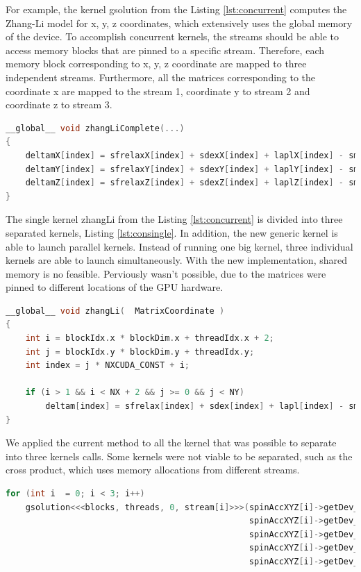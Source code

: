 For example, the kernel {\listf gsolution} from the Listing \ref{lst:concurrent} computes the Zhang-Li model for x, y, z coordinates, which extensively uses the global memory of the device. To accomplish concurrent kernels, the streams should be able to access memory blocks that are pinned to a specific stream. Therefore, each memory block corresponding to x, y, z coordinate are mapped to three independent streams. Furthermore, all the matrices corresponding to the coordinate x are mapped to the stream 1, coordinate y to stream 2 and coordinate z to stream 3.

\begin{lstlisting}[language=C++, label={lst:concurrent}, caption={Evaluation of x, y, z coordinates of the Zhang and Li model in a single kernel.}]
__global__ void zhangLiComplete(...)
{
	deltamX[index] = sfrelaxX[index] + sdexX[index] + laplX[index] - smX[index];
	deltamY[index] = sfrelaxY[index] + sdexY[index] + laplY[index] - smY[index];
	deltamZ[index] = sfrelaxZ[index] + sdexZ[index] + laplZ[index] - smZ[index];
}
\end{lstlisting}
 
The single kernel {\listf zhangLi} from the Listing \ref{lst:concurrent} is divided into three separated kernels, Listing \ref{lst:consingle}. In addition, the new generic kernel is able to launch parallel kernels. Instead of running one big kernel, three individual kernels are able to launch simultaneously. With the new implementation, shared memory is no feasible. Perviously wasn't possible, due to the matrices were pinned to different locations of the GPU hardware. 

\begin{lstlisting}[language=C++, label={lst:consingle}, caption={Evaluation of individual coordinates of the Zhang and Li model.}]
__global__ void zhangLi(  MatrixCoordinate )
{
	int i = blockIdx.x * blockDim.x + threadIdx.x + 2;
	int j = blockIdx.y * blockDim.y + threadIdx.y;
	int index = j * NXCUDA_CONST + i;

	if (i > 1 && i < NX + 2 && j >= 0 && j < NY)
		deltam[index] = sfrelax[index] + sdex[index] + lapl[index] - sm[index];
}
\end{lstlisting}

We applied the current method to all the kernel that was possible to separate into three kernels calls. Some kernels were not viable to be separated, such as the cross product, which uses memory allocations from different streams.

\begin{lstlisting}[language=C++, caption={Evaluate Zhang and Li model.}]
for (int i  = 0; i < 3; i++)
	gsolution<<<blocks, threads, 0, stream[i]>>>(spinAccXYZ[i]->getDev_deltam(),
												 spinAccXYZ[i]->getDev_sfrelax(), 
												 spinAccXYZ[i]->getDev_sm(), 
											 	 spinAccXYZ[i]->getDev_sdex(),
											 	 spinAccXYZ[i]->getDev_lapl());
\end{lstlisting}

